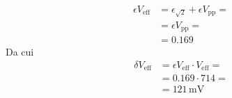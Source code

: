 \documentclass{article}
\begin{document}
				\begin{equation*}
					\begin{split}
						\epsilon V_{\mathrm{eff}} &= \epsilon_{\mathrm{\sqrt{2}}} + \epsilon V_{\mathrm{pp}} = \\
												  &= \epsilon V_{\mathrm{pp}} = \\
												  &= 0.169
					\end{split}
				\end{equation*}
				Da cui
				\begin{equation*}
					\begin{split}
						\delta V_{\mathrm{eff}} &= \epsilon V_{\mathrm{eff}} \cdot V_{\mathrm{eff}} = \\
												&= 0.169 \cdot 714 = \\
												&= 121 \, \mathrm{mV}
					\end{split}
				\end{equation*}
\end{document}
